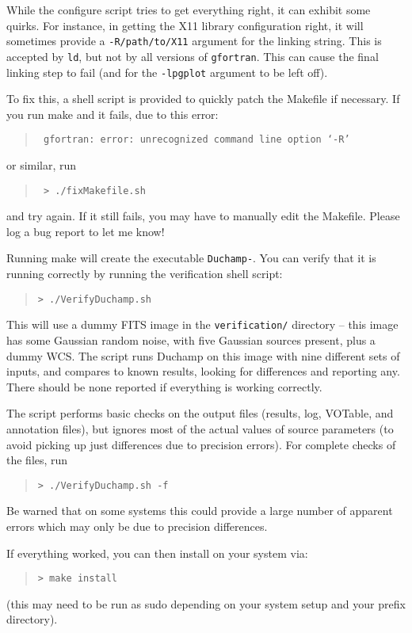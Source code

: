 While the configure script tries to get everything right, it can
exhibit some quirks. For instance, in getting the X11 library
configuration right, it will sometimes provide a
\texttt{-R/path/to/X11} argument for the linking string. This is
accepted by \texttt{ld}, but not by all versions of \texttt{gfortran}.
This can cause the final linking step to fail (and for the
\texttt{-lpgplot} argument to be left off).

To fix this, a shell script is provided to quickly patch the Makefile
if necessary. If you run make and it fails, due to this error:
\begin{quote}
{\footnotesize
\texttt{%
   gfortran: error: unrecognized command line option ‘-R’}
}
\end{quote}
 or similar, run 
\begin{quote}
{\footnotesize
\texttt{%
 > ./fixMakefile.sh}
}
\end{quote}
and try again. If it still fails, you may have to manually edit the
Makefile. Please log a bug report to let me know!




Running make will create the executable \texttt{Duchamp-{\version}}. You can
verify that it is running correctly by running the verification shell
script:
\begin{quote}
{\footnotesize
\texttt{> ./VerifyDuchamp.sh}
}
\end{quote}
This will use a dummy FITS image in the \texttt{verification/}
directory -- this image has some Gaussian random noise, with five
Gaussian sources present, plus a dummy WCS. The script runs
Duchamp on this image with nine different sets of inputs, and
compares to known results, looking for differences and reporting
any. There should be none reported if everything is working
correctly. 

The script performs basic checks on the output files (results, log,
VOTable, and annotation files), but ignores most of the actual values
of source parameters (to avoid picking up just differences due to
precision errors). For complete checks of the files, run
\begin{quote}
  {\footnotesize
    \texttt{> ./VerifyDuchamp.sh -f}
  }
\end{quote}
Be warned that on some systems this could provide a large number of
apparent errors which may only be due to precision differences.

If everything worked, you can then install \duchamp on your system via:
\begin{quote}
{\footnotesize
\texttt{> make install}
}
\end{quote}
(this may need to be run as sudo depending on your system setup and
your prefix directory).

